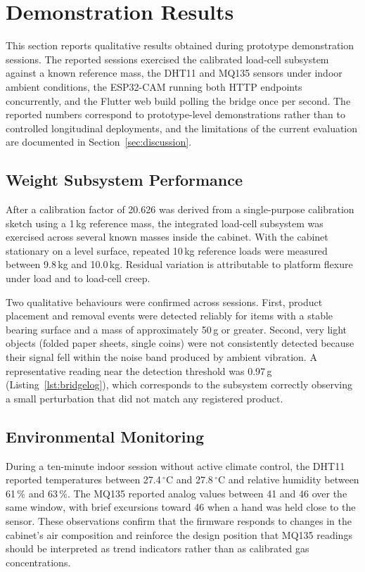 \section{Demonstration Results}
\label{sec:results}

This section reports qualitative results obtained during prototype
demonstration sessions. The reported sessions exercised the
calibrated load-cell subsystem against a known reference mass, the
DHT11 and MQ135 sensors under indoor ambient conditions, the
ESP32-CAM running both HTTP endpoints concurrently, and the Flutter
web build polling the bridge once per second. The reported numbers
correspond to prototype-level demonstrations rather than to
controlled longitudinal deployments, and the limitations of the
current evaluation are documented in Section~\ref{sec:discussion}.

\subsection{Weight Subsystem Performance}

After a calibration factor of 20.626 was derived from a single-purpose
calibration sketch using a 1\,kg reference mass, the integrated
load-cell subsystem was exercised across several known masses inside
the cabinet. With the cabinet stationary on a level surface,
repeated 10\,kg reference loads were measured between 9.8\,kg and
10.0\,kg. Residual variation is attributable to platform flexure
under load and to load-cell creep.

Two qualitative behaviours were confirmed across sessions. First,
product placement and removal events were detected reliably for
items with a stable bearing surface and a mass of approximately
50\,g or greater. Second, very light objects (folded paper sheets,
single coins) were not consistently detected because their signal
fell within the noise band produced by ambient vibration. A
representative reading near the detection threshold was 0.97\,g
(Listing~\ref{lst:bridgelog}), which corresponds to the subsystem
correctly observing a small perturbation that did not match any
registered product.

\subsection{Environmental Monitoring}

During a ten-minute indoor session without active climate control,
the DHT11 reported temperatures between 27.4\,$^\circ$C and
27.8\,$^\circ$C and relative humidity between 61\,\% and 63\,\%. The
MQ135 reported analog values between 41 and 46 over the same window,
with brief excursions toward 46 when a hand was held close to the
sensor. These observations confirm that the firmware responds to
changes in the cabinet's air composition and reinforce the design
position that MQ135 readings should be interpreted as trend
indicators rather than as calibrated gas concentrations.

